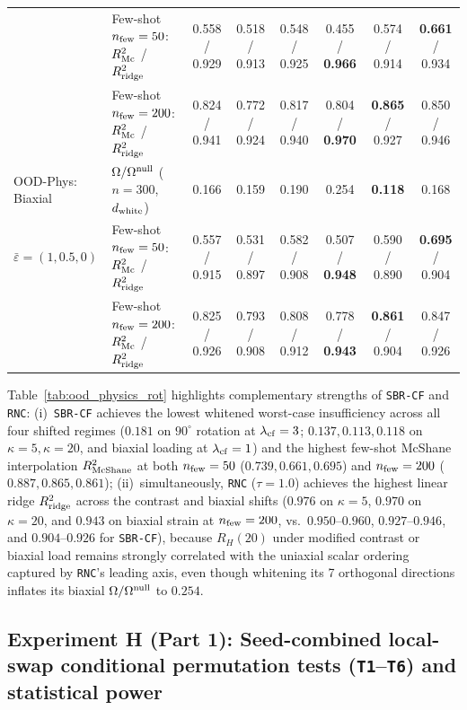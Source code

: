 \documentclass[preprint,11pt,a4paper]{elsarticle}
\begin{document}
\begin{table}[ht!]
{\begin{tabular}{llcccccc}
 & Few-shot $n_{\rm few}=50$: $R^2_{\rm Mc}$ / $R^2_{\rm ridge}$ & 0.558 / 0.929 & 0.518 / 0.913 & 0.548 / 0.925 & 0.455 / \textbf{0.966} & 0.574 / 0.914 & \textbf{0.661} / 0.934 \\
 & Few-shot $n_{\rm few}=200$: $R^2_{\rm Mc}$ / $R^2_{\rm ridge}$ & 0.824 / 0.941 & 0.772 / 0.924 & 0.817 / 0.940 & 0.804 / \textbf{0.970} & \textbf{0.865} / 0.927 & 0.850 / 0.946 \\
\midrule
OOD-Phys: Biaxial
 & $\Omega/\Omega^{\rm null}$ ($n=300$, $d_{\rm white}$) & 0.166 & 0.159 & 0.190 & 0.254 & \textbf{0.118} & 0.168 \\
$\bar\varepsilon=(1, 0.5, 0)$
 & Few-shot $n_{\rm few}=50$: $R^2_{\rm Mc}$ / $R^2_{\rm ridge}$ & 0.557 / 0.915 & 0.531 / 0.897 & 0.582 / 0.908 & 0.507 / \textbf{0.948} & 0.590 / 0.890 & \textbf{0.695} / 0.904 \\
 & Few-shot $n_{\rm few}=200$: $R^2_{\rm Mc}$ / $R^2_{\rm ridge}$ & 0.825 / 0.926 & 0.793 / 0.908 & 0.808 / 0.912 & 0.778 / \textbf{0.943} & \textbf{0.861} / 0.904 & 0.847 / 0.926 \\
\bottomrule
\end{tabular}%
}
\end{table}

Table~\ref{tab:ood_physics_rot} highlights complementary strengths of \texttt{SBR-CF} and \texttt{RNC}:
(i)~\texttt{SBR-CF} achieves the lowest whitened worst-case insufficiency across all four shifted regimes ($0.181$ on $90^\circ$ rotation at $\lambda_{\rm cf}=3$; $0.137, 0.113, 0.118$ on $\kappa=5, \kappa=20$, and biaxial loading at $\lambda_{\rm cf}=1$) and the highest few-shot McShane interpolation $R^2_{\rm McShane}$ at both $n_{\rm few}=50$ ($0.739, 0.661, 0.695$) and $n_{\rm few}=200$ ($0.887, 0.865, 0.861$);
(ii)~simultaneously, \texttt{RNC} ($\tau=1.0$) achieves the highest linear ridge $R^2_{\rm ridge}$ across the contrast and biaxial shifts ($0.976$ on $\kappa=5$, $0.970$ on $\kappa=20$, and $0.943$ on biaxial strain at $n_{\rm few}=200$, vs.\ $0.950\text{--}0.960$, $0.927\text{--}0.946$, and $0.904\text{--}0.926$ for \texttt{SBR-CF}), because $R_H(20)$ under modified contrast or biaxial load remains strongly correlated with the uniaxial scalar ordering captured by \texttt{RNC}'s leading axis, even though whitening its 7 orthogonal directions inflates its biaxial $\Omega/\Omega^{\rm null}$ to $0.254$.

\subsection{Experiment H (Part 1): Seed-combined local-swap conditional permutation tests (\texttt{T1}--\texttt{T6}) and statistical power}
\label{sec:cond_tests}
\end{document}
